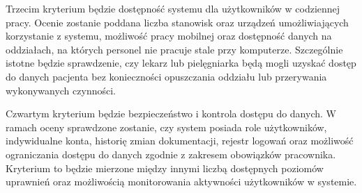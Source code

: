 Trzecim kryterium będzie dostępność systemu dla użytkowników w codziennej pracy. Ocenie zostanie poddana liczba stanowisk oraz urządzeń umożliwiających korzystanie z systemu, możliwość pracy mobilnej oraz dostępność danych na oddziałach, na których personel nie pracuje stale przy komputerze. Szczególnie istotne będzie sprawdzenie, czy lekarz lub pielęgniarka będą mogli uzyskać dostęp do danych pacjenta bez konieczności opuszczania oddziału lub przerywania wykonywanych czynności.

Czwartym kryterium będzie bezpieczeństwo i kontrola dostępu do danych. W ramach oceny sprawdzone zostanie, czy system posiada role użytkowników, indywidualne konta, historię zmian dokumentacji, rejestr logowań oraz możliwość ograniczania dostępu do danych zgodnie z zakresem obowiązków pracownika. Kryterium to będzie mierzone między innymi liczbą dostępnych poziomów uprawnień oraz możliwością monitorowania aktywności użytkowników w systemie.
